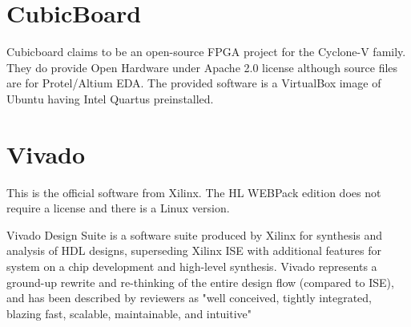 \section{CubicBoard}
Cubicboard claims to be an open-source FPGA project for the Cyclone-V family.
They do provide Open Hardware under Apache 2.0 license although source files are for Protel/Altium EDA.
The provided software is a VirtualBox image of Ubuntu having Intel Quartus preinstalled.

\section{Vivado}
This is the official software from Xilinx. The HL WEBPack edition does not require a license and there is a Linux version.

Vivado Design Suite is a software suite produced by Xilinx for synthesis and analysis of HDL designs, superseding Xilinx ISE with additional features for system on a chip development and high-level synthesis. Vivado represents a ground-up rewrite and re-thinking of the entire design flow (compared to ISE), and has been described by reviewers as "well conceived, tightly integrated, blazing fast, scalable, maintainable, and intuitive"\cite{Wikipedia_Vivado}

